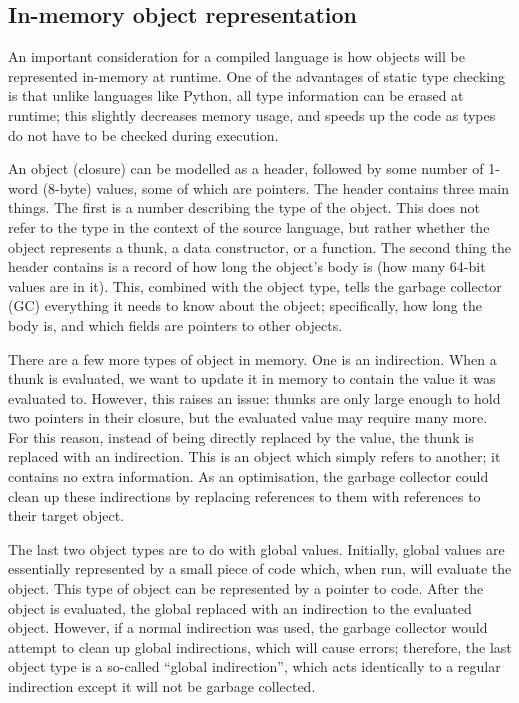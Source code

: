 \documentclass[9pt]{extarticle}
\begin{document}
\subsection{In-memory object representation}

An important consideration for a compiled language is how objects will
be represented in-memory at runtime. One of the advantages of static
type checking is that unlike languages like Python, all type information
can be erased at runtime; this slightly decreases memory usage, and
speeds up the code as types do not have to be checked during execution.

An object (closure) can be modelled as a header, followed by some number
of 1-word (8-byte) values, some of which are pointers. The header
contains three main things. The first is a number describing the type of
the object. This does not refer to the type in the context of the source
language, but rather whether the object represents a thunk, a data
constructor, or a function. The second thing the header contains is a
record of how long the object's body is (how many 64-bit values are in
it). This, combined with the object type, tells the garbage collector
(GC) everything it needs to know about the object; specifically, how
long the body is, and which fields are pointers to other objects.

There are a few more types of object in memory. One is an indirection.
When a thunk is evaluated, we want to update it in memory to contain the
value it was evaluated to. However, this raises an issue: thunks are
only large enough to hold two pointers in their closure, but the
evaluated value may require many more. For this reason, instead of being
directly replaced by the value, the thunk is replaced with an
indirection. This is an object which simply refers to another; it
contains no extra information.  As an optimisation, the garbage
collector could clean up these indirections by replacing references to
them with references to their target object.

The last two object types are to do with global values. Initially,
global values are essentially represented by a small piece of code
which, when run, will evaluate the object. This type of object can be
represented by a pointer to code. After the object is evaluated, the
global replaced with an indirection to the evaluated object. However, if
a normal indirection was used, the garbage collector would attempt to
clean up global indirections, which will cause errors; therefore, the
last object type is a so-called ``global indirection'', which acts
identically to a regular indirection except it will not be garbage
collected.
\end{document}
